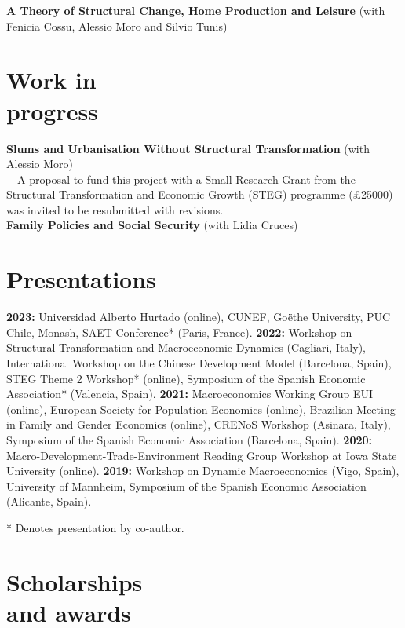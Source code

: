 \documentclass[margin]{res} %
\begin{document}
\begin{resume}
{\bf A Theory of Structural Change, Home Production and Leisure} (with Fenicia Cossu, Alessio Moro and Silvio Tunis) 

\section{Work in \\ progress}
{\bf Slums and Urbanisation Without Structural Transformation} (with Alessio Moro) \\
---A proposal to fund this project with a Small Research Grant from the Structural Transformation and Economic Growth (STEG) programme (£25000) was invited to be resubmitted with revisions. \\
{\bf Family Policies and Social Security} (with Lidia Cruces)

\section{Presentations}

{\bf 2023:} Universidad Alberto Hurtado (online), CUNEF, Go\"ethe University, PUC Chile, Monash, SAET Conference* (Paris, France). {\bf 2022:} Workshop on Structural Transformation and Macroeconomic Dynamics (Cagliari, Italy), International Workshop on the Chinese Development Model (Barcelona, Spain), STEG Theme 2 Workshop* (online), Symposium of the Spanish Economic Association* (Valencia, Spain). {\bf 2021:} Macroeconomics Working Group EUI (online), European Society for Population Economics (online), Brazilian Meeting in Family and Gender Economics (online), CRENoS Workshop (Asinara, Italy), Symposium of the Spanish Economic Association (Barcelona, Spain). {\bf 2020:} Macro-Development-Trade-Environment Reading Group Workshop at Iowa State University (online). {\bf 2019:} Workshop on Dynamic Macroeconomics (Vigo, Spain), University of Mannheim, Symposium of the Spanish Economic Association (Alicante, Spain).

* Denotes presentation by co-author.


\section{Scholarships \\ and awards} 


\end{resume}
\end{document}
